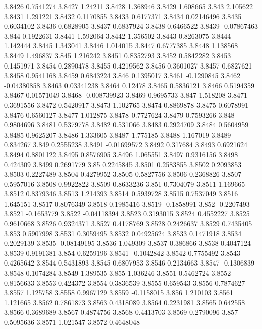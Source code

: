 3.8426  0.7541274
3.8427  1.24211
3.8428  1.368946
3.8429  1.608665
3.843  2.105622
3.8431  1.291221
3.8432  0.1170855
3.8433  0.6177371
3.8434  0.02146496
3.8435  0.6034102
3.8436  0.6828905
3.8437  0.6837924
3.8438  0.6466522
3.8439  -0.07867463
3.844  0.1922631
3.8441  1.592064
3.8442  1.356502
3.8443  0.8263075
3.8444  1.142444
3.8445  1.343041
3.8446  1.014015
3.8447  0.6777385
3.8448  1.138568
3.8449  1.496837
3.845  1.216242
3.8451  0.8352793
3.8452  0.5842282
3.8453  0.1451971
3.8454  0.2890478
3.8455  0.4219562
3.8456  0.3601027
3.8457  0.6827621
3.8458  0.9541168
3.8459  0.6843224
3.846  0.1395017
3.8461  -0.1290845
3.8462  -0.04380858
3.8463  0.03341238
3.8464  0.12478
3.8465  0.5836121
3.8466  0.5194359
3.8467  0.01571049
3.8468  -0.008739923
3.8469  0.9695733
3.847  1.518208
3.8471  0.3691556
3.8472  0.5420917
3.8473  1.102765
3.8474  0.8869878
3.8475  0.6078991
3.8476  0.6560127
3.8477  1.012875
3.8478  0.7727624
3.8479  0.7593266
3.848  0.9804696
3.8481  0.5379778
3.8482  0.531066
3.8483  0.2924709
3.8484  0.5604959
3.8485  0.9625207
3.8486  1.333605
3.8487  1.775185
3.8488  1.167019
3.8489  0.834267
3.849  0.2555238
3.8491  -0.01699572
3.8492  0.317684
3.8493  0.6921624
3.8494  0.8801122
3.8495  0.8576905
3.8496  1.065551
3.8497  0.9316156
3.8498  0.424309
3.8499  0.2691779
3.85  0.2245845
3.8501  0.2583855
3.8502  0.2093853
3.8503  0.2227489
3.8504  0.4279952
3.8505  0.5827756
3.8506  0.2368826
3.8507  0.5957016
3.8508  0.9922822
3.8509  0.8633236
3.851  0.7304079
3.8511  1.169665
3.8512  0.8379346
3.8513  1.214393
3.8514  0.5939728
3.8515  0.7537049
3.8516  1.645151
3.8517  0.8076349
3.8518  0.1985416
3.8519  -0.1858991
3.852  -0.2207493
3.8521  -0.1653779
3.8522  -0.04118394
3.8523  0.3193015
3.8524  0.4552227
3.8525  0.9610668
3.8526  0.9324371
3.8527  0.4178769
3.8528  0.2426637
3.8529  0.7435405
3.853  0.5907998
3.8531  0.3059495
3.8532  0.04925624
3.8533  0.1471918
3.8534  0.2029139
3.8535  -0.08149195
3.8536  1.049309
3.8537  0.386866
3.8538  0.4047124
3.8539  0.9191381
3.854  0.6259196
3.8541  -0.1042842
3.8542  0.7755492
3.8543  0.4265642
3.8544  0.5431893
3.8545  0.6807953
3.8546  0.2134663
3.8547  -0.1306839
3.8548  0.1074284
3.8549  1.389535
3.855  1.036246
3.8551  0.5462724
3.8552  0.8156633
3.8553  0.424372
3.8554  0.3836539
3.8555  0.659543
3.8556  0.7874627
3.8557  1.125758
3.8558  0.9967129
3.8559  -0.1158015
3.856  1.210103
3.8561  1.121665
3.8562  0.7861873
3.8563  0.4318089
3.8564  0.2231981
3.8565  0.642558
3.8566  0.3689689
3.8567  0.4874756
3.8568  0.4413703
3.8569  0.2790096
3.857  0.5095636
3.8571  1.021547
3.8572  0.4648048
